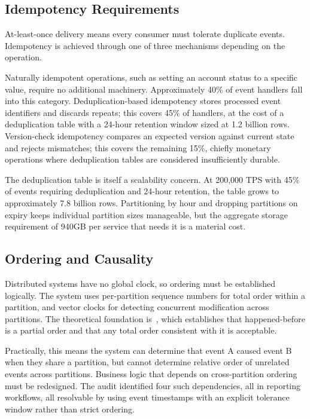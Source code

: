 \subsection{Idempotency Requirements}

At-least-once delivery means every consumer must tolerate duplicate events. Idempotency is achieved through one of three mechanisms depending on the operation.

Naturally idempotent operations, such as setting an account status to a specific value, require no additional machinery. Approximately 40\% of event handlers fall into this category. Deduplication-based idempotency stores processed event identifiers and discards repeats; this covers 45\% of handlers, at the cost of a deduplication table with a 24-hour retention window sized at 1.2 billion rows. Version-check idempotency compares an expected version against current state and rejects mismatches; this covers the remaining 15\%, chiefly monetary operations where deduplication tables are considered insufficiently durable.

The deduplication table is itself a scalability concern. At 200,000 TPS with 45\% of events requiring deduplication and 24-hour retention, the table grows to approximately 7.8 billion rows. Partitioning by hour and dropping partitions on expiry keeps individual partition sizes manageable, but the aggregate storage requirement of 940GB per service that needs it is a material cost.

\subsection{Ordering and Causality}

Distributed systems have no global clock, so ordering must be established logically. The system uses per-partition sequence numbers for total order within a partition, and vector clocks for detecting concurrent modification across partitions. The theoretical foundation is~\cite{lamport-time-clocks-1978}, which establishes that happened-before is a partial order and that any total order consistent with it is acceptable.

Practically, this means the system can determine that event A caused event B when they share a partition, but cannot determine relative order of unrelated events across partitions. Business logic that depends on cross-partition ordering must be redesigned. The audit identified four such dependencies, all in reporting workflows, all resolvable by using event timestamps with an explicit tolerance window rather than strict ordering.

